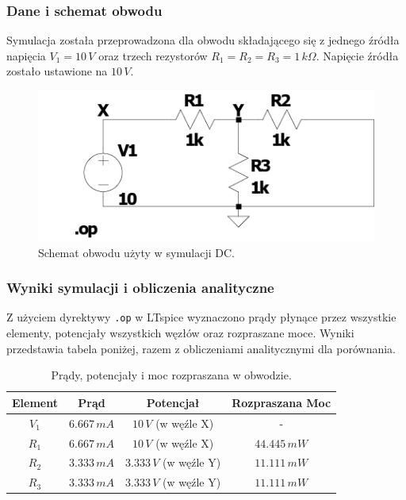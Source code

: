 \documentclass[10pt]{article}
\begin{document}
	\subsubsection*{Dane i schemat obwodu}
	Symulacja została przeprowadzona dla obwodu składającego się z jednego źródła napięcia \(V_1 = 10\,V\) oraz trzech rezystorów \(R_1 = R_2 = R_3 = 1\,k\Omega\). Napięcie źródła zostało ustawione na \(10\,V\).

	\begin{figure}[H]
		\hspace*{0.5cm}
		\includegraphics[width=0.8\linewidth]{1aobwod}
		\caption{Schemat obwodu użyty w symulacji DC.}
		\label{fig:1aobwod}
	\end{figure}
	\pagebreak
	\subsubsection*{Wyniki symulacji i obliczenia analityczne}
	Z użyciem dyrektywy \texttt{.op} w LTspice wyznaczono prądy płynące przez wszystkie elementy, potencjały wszystkich węzłów oraz rozpraszane moce. Wyniki przedstawia tabela poniżej, razem z obliczeniami analitycznymi dla porównania.

	\begin{table}[H]
		\centering
		\begin{tabular}{|c|c|c|c|}
			\hline
			Element & Prąd & Potencjał & Rozpraszana Moc \\ \hline
			\(V_1\) & \(6.667\,mA\) & \(10\,V\) (w węźle X) & - \\ \hline
			\(R_1\) & \(6.667\,mA\) & \(10\,V\) (w węźle X) & \(44.445\,mW\) \\ \hline
			\(R_2\) & \(3.333\,mA\) & \(3.333\,V\) (w węźle Y) & \(11.111\,mW\) \\ \hline
			\(R_3\) & \(3.333\,mA\) & \(3.333\,V\) (w węźle Y) & \(11.111\,mW\) \\ \hline
		\end{tabular}
		\caption{Prądy, potencjały i moc rozpraszana w obwodzie.}
		\label{tab:prady_potencjaly_moc}
	\end{table}
	
\end{document}
